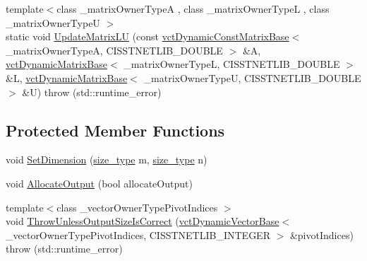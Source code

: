 \begin{DoxyCompactItemize}
\item 
{\footnotesize template$<$class \+\_\+matrix\+Owner\+Type\+A , class \+\_\+matrix\+Owner\+Type\+L , class \+\_\+matrix\+Owner\+Type\+U $>$ }\\static void \hyperlink{classnmr_l_u_dynamic_data_aa443b07fe53b5008e217350c86f4dd35}{Update\+Matrix\+L\+U} (const \hyperlink{classvct_dynamic_const_matrix_base}{vct\+Dynamic\+Const\+Matrix\+Base}$<$ \+\_\+matrix\+Owner\+Type\+A, C\+I\+S\+S\+T\+N\+E\+T\+L\+I\+B\+\_\+\+D\+O\+U\+B\+L\+E $>$ \&A, \hyperlink{classvct_dynamic_matrix_base}{vct\+Dynamic\+Matrix\+Base}$<$ \+\_\+matrix\+Owner\+Type\+L, C\+I\+S\+S\+T\+N\+E\+T\+L\+I\+B\+\_\+\+D\+O\+U\+B\+L\+E $>$ \&L, \hyperlink{classvct_dynamic_matrix_base}{vct\+Dynamic\+Matrix\+Base}$<$ \+\_\+matrix\+Owner\+Type\+U, C\+I\+S\+S\+T\+N\+E\+T\+L\+I\+B\+\_\+\+D\+O\+U\+B\+L\+E $>$ \&U)  throw (std\+::runtime\+\_\+error)
\end{DoxyCompactItemize}
\subsection*{Protected Member Functions}
\begin{DoxyCompactItemize}
\item 
void \hyperlink{classnmr_l_u_dynamic_data_ae25247c2e585c43ca927686461f2c699}{Set\+Dimension} (\hyperlink{classnmr_l_u_dynamic_data_a63259a289f8f94498b5102ce39722bbe}{size\+\_\+type} m, \hyperlink{classnmr_l_u_dynamic_data_a63259a289f8f94498b5102ce39722bbe}{size\+\_\+type} n)
\item 
void \hyperlink{classnmr_l_u_dynamic_data_ae6ca3b268d36249e02ccaea0a5f5c7df}{Allocate\+Output} (bool allocate\+Output)
\item 
{\footnotesize template$<$class \+\_\+vector\+Owner\+Type\+Pivot\+Indices $>$ }\\void \hyperlink{classnmr_l_u_dynamic_data_afca11b4a534d409a919a1dec84052abb}{Throw\+Unless\+Output\+Size\+Is\+Correct} (\hyperlink{classvct_dynamic_vector_base}{vct\+Dynamic\+Vector\+Base}$<$ \+\_\+vector\+Owner\+Type\+Pivot\+Indices, C\+I\+S\+S\+T\+N\+E\+T\+L\+I\+B\+\_\+\+I\+N\+T\+E\+G\+E\+R $>$ \&pivot\+Indices)  throw (std\+::runtime\+\_\+error)
\end{DoxyCompactItemize}

